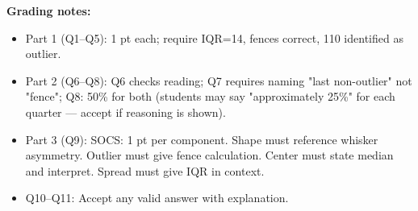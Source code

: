 \documentclass[10pt]{article}
\begin{document}
\begin{teachernote}
\textbf{Grading notes:}
\begin{itemize}[itemsep=2pt]
  \item Part 1 (Q1--Q5): 1 pt each; require IQR=14, fences correct, 110 identified as outlier.
  \item Part 2 (Q6--Q8): Q6 checks reading; Q7 requires naming "last non-outlier" not "fence"; Q8: 50\% for both (students may say "approximately 25\%" for each quarter — accept if reasoning is shown).
  \item Part 3 (Q9): SOCS: 1 pt per component. Shape must reference whisker asymmetry. Outlier must give fence calculation. Center must state median and interpret. Spread must give IQR in context.
  \item Q10--Q11: Accept any valid answer with explanation.
\end{itemize}
\end{teachernote}
\end{document}
